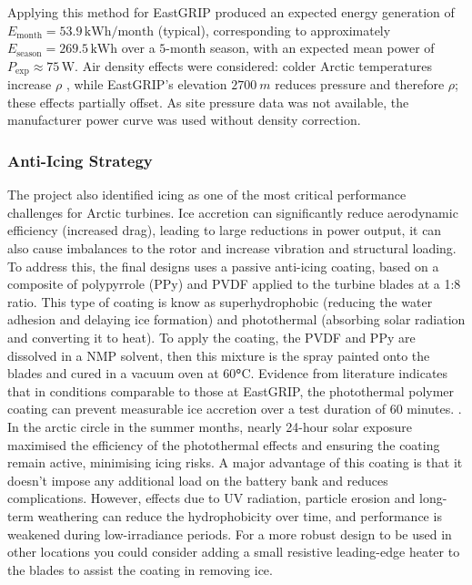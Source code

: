 \documentclass[11pt,a4paper]{article}
\begin{document}
Applying this method for EastGRIP produced an expected energy generation of \(E_{\mathrm{month}}=53.9\,\mathrm{kWh/month}\) (typical), corresponding to approximately \(E_{\mathrm{season}}=269.5\,\mathrm{kWh}\) over a \(5\)-month season, with an expected mean power of \(P_{\mathrm{exp}}\approx 75\,\mathrm{W}\). Air density effects were considered: colder Arctic temperatures increase $\rho$ , while EastGRIP’s elevation $2700~m$ reduces pressure and therefore $\rho$; these effects partially offset. As site pressure data was not available, the manufacturer power curve was used without density correction.

\subsubsection{Anti-Icing Strategy}
The project also identified icing as one of the most critical performance challenges for Arctic turbines. Ice accretion can significantly reduce aerodynamic efficiency (increased drag), leading to large reductions in power output, it can also cause imbalances to the rotor and increase vibration and structural loading. To address this, the final designs uses a passive anti-icing coating, based on a composite of polypyrrole (PPy) and PVDF applied to the turbine blades at a 1:8 ratio. This type of coating is know as superhydrophobic (reducing the water adhesion and delaying ice formation) and photothermal (absorbing solar radiation and converting it to heat).  To apply the coating, the PVDF and PPy are dissolved in a NMP solvent, then this mixture is the spray painted onto the blades and cured in a vacuum oven at 60\textbf{°}C. Evidence from literature indicates that in conditions comparable to those at EastGRIP, the photothermal polymer coating can prevent measurable ice accretion over a test duration of 60 minutes. \cite{antiicingstudy}. In the arctic circle in the summer months, nearly 24-hour solar exposure maximised the efficiency of the photothermal effects and ensuring the coating remain active, minimising icing risks. A major advantage of this coating is that it doesn't impose any additional load on the battery bank and reduces complications. However, effects due to UV radiation, particle erosion and long-term weathering can reduce the hydrophobicity over time, and performance is weakened during low-irradiance periods. For a more robust design to be used in other locations you could consider adding a small resistive leading-edge heater to the blades to assist the coating in removing ice. 
\end{document}
